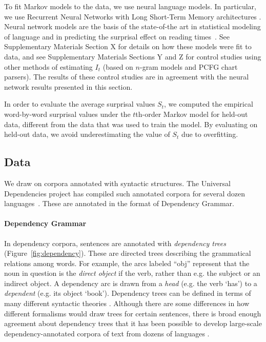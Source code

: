 To fit Markov models to the data, we use neural language models. In particular, we use Recurrent Neural Networks with Long Short-Term Memory architectures \citep{hochreiter-long-1997}. 
Neural network models are the basis of the state-of-the art in statistical modeling of language and in predicting the surprisal effect on reading times~\citep{frank-insensitivity-2011,goodkind-predictive-2018}.
See Supplementary Materials Section X for details on how these models were fit to data, and see Supplementary Materials Sections Y and Z for control studies using other methods of estimating $I_t$ (based on $n$-gram models and PCFG chart parsers). The results of these control studies are in agreement with the neural network results presented in this section.

In order to evaluate the average surprisal values $S_t$, we computed the empirical word-by-word surprisal values under the $t$th-order Markov model for held-out data, different from the data that was used to train the model. By evaluating on held-out data, we avoid underestimating the value of $S_t$ due to overfitting.

\subsection{Data}
We draw on corpora annotated with syntactic structures.
The Universal Dependencies project has compiled such annotated corpora for several dozen languages~\citep{nivre-universal-2017}.
These are annotated in the format of Dependency Grammar.

\paragraph{Dependency Grammar}
In dependency corpora, sentences are annotated with \emph{dependency trees} (Figure~\ref{fig:dependency}).
These are directed trees describing the grammatical relations among words. For example, the arcs labeled ``obj'' represent that the noun in question is the \emph{direct object} if the verb, rather than e.g. the subject or an indirect object.
A dependency arc is drawn from a \emph{head} (e.g. the verb `has') to a \emph{dependent} (e.g. its object `book').
Dependency trees can be defined in terms of many different syntactic theories \citep{corbett1993heads}.
Although there are some differences in how different formalisms would draw trees for certain sentences, there is broad enough agreement about dependency trees that it has been possible to develop large-scale dependency-annotated corpora of text from dozens of languages \citep{nivre2017universal}.

